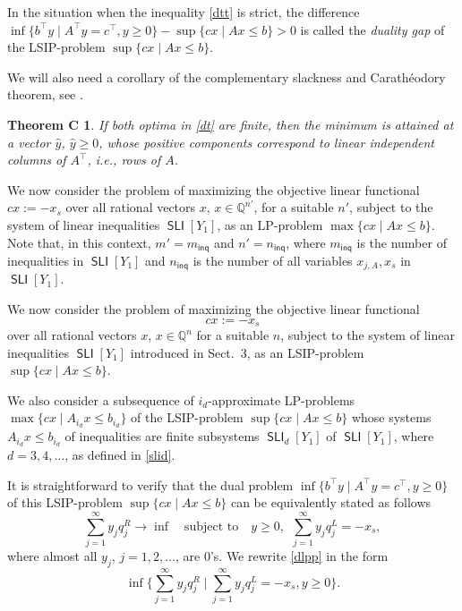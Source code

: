 \documentclass[10pt, reqno]{amsart}
\numberwithin{equation}{section}
\newtheorem*{TC}{Theorem C}
\begin{document}
In the situation when the inequality \eqref{dtt} is strict,  the difference
$\inf \{ b^{\top}y \mid A^{\top}y = c^{\top}, y\ge 0  \} - \sup \{ cx \mid Ax \le b    \} >0$
is called the {\em duality gap} of the LSIP-problem $\sup \{ cx \mid Ax \le b \}$.

We will also need a corollary of the complementary slackness and Carath\'eodory theorem, see  \cite[Corollary 7.11]{S86}.

\begin{TC} If both optima in \eqref{dt} are finite, then the minimum is attained at a vector $\widehat y$, $\widehat y \ge 0$, whose positive components correspond to linear independent  columns of $A^{\top}$, i.e., rows of $A$.
\end{TC}

We now consider the problem of maximizing the objective linear functional $cx :=  -x_s$   over all rational vectors $x$, $x \in \mathbb Q^{n'}$, for a suitable $n'$, subject to the system of  linear inequalities $\operatorname{\textsf{SLI}}[Y_1]$, as an LP-problem $\max \{ cx \mid Ax \le b  \}$.
Note that, in this context, $m' = m_\operatorname{\textsf{inq}}$ and $n' = n_\operatorname{\textsf{inq}}$, where $m_\operatorname{\textsf{inq}}$ is the number of inequalities in $\operatorname{\textsf{SLI}}[Y_1]$
and $n_\operatorname{\textsf{inq}}$ is the number of all variables $x_{j, A}, x_s$ in $\operatorname{\textsf{SLI}}[Y_1]$.

We now consider the problem of maximizing the objective linear functional
$$cx :=  -x_s$$   over all rational vectors $x$, $x \in \mathbb Q^{n}$ for a suitable $n$, subject to the system of linear inequalities $\operatorname{\textsf{SLI}}[Y_1]$ introduced in Sect.~3, as an LSIP-problem $\sup \{ cx \mid Ax \le b  \}$.

We also consider a subsequence of $i_d$-approximate LP-problems $\max \{ cx \mid A_{i_d} x \le b_{i_d}  \} $ of the
LSIP-problem $\sup \{ cx \mid Ax \le b  \}$
 whose systems $A_{i_d}x  \le b_{i_d}$ of inequalities are finite subsystems  $\operatorname{\textsf{SLI}}_d[Y_1]$ of  $\operatorname{\textsf{SLI}}[Y_1]$, where  $d = 3,4, \dots$, as defined in \eqref{slid}.

It is straightforward to verify that the dual problem
$\inf \{ b^{\top} y  \mid  A^{\top} y = c^{\top}, y\ge 0 \}$ of this LSIP-problem $\sup \{ cx \mid Ax \le b  \}$   can be equivalently stated as follows
\begin{equation}\label{dlpp}
\sum_{j=1}^{\infty } y_j q_j^R \to \inf  \quad  \mbox{subject to} \quad   y \ge 0 , \  \
\sum_{j=1}^{\infty } y_j q_j^L = - x_s ,
\end{equation}
where almost all  $y_j$, $j=1,2,\dots$,  are 0's.  We rewrite
\eqref{dlpp} in the form
\begin{equation}\label{dlp}
\inf \{ \sum_{j=1}^{\infty} y_j q_j^R \mid  \sum_{j=1}^{\infty} y_j q_j^L = - x_s , y \ge 0  \} .
\end{equation}
\end{document}
